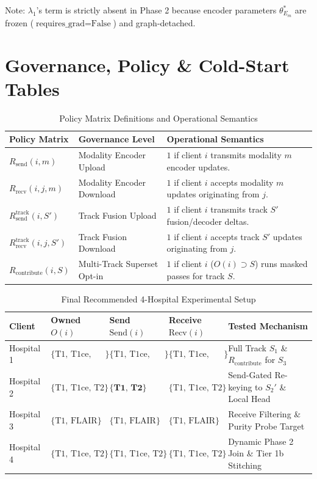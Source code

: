 \documentclass[11pt,a4paper]{article}
\begin{document}
Note: $\lambda_1$'s term is strictly absent in Phase 2 because encoder parameters $\theta_{E_m}^*$ are frozen ($\text{requires\_grad}=\text{False}$) and graph-detached.

\newpage

\section{Governance, Policy \& Cold-Start Tables}

\begin{table}[h!]
\centering
\caption{Policy Matrix Definitions and Operational Semantics}
\label{tab:policies}
\small
\begin{tabular}{@{}lll@{}}
\toprule
\textbf{Policy Matrix} & \textbf{Governance Level} & \textbf{Operational Semantics} \\ \midrule
$R_{\text{send}}(i,m)$ & Modality Encoder Upload & $1$ if client $i$ transmits modality $m$ encoder updates. \\
$R_{\text{recv}}(i,j,m)$ & Modality Encoder Download & $1$ if client $i$ accepts modality $m$ updates originating from $j$. \\
$R_{\text{send}}^{\text{track}}(i,S')$ & Track Fusion Upload & $1$ if client $i$ transmits track $S'$ fusion/decoder deltas. \\
$R_{\text{recv}}^{\text{track}}(i,j,S')$ & Track Fusion Download & $1$ if client $i$ accepts track $S'$ updates originating from $j$. \\
$R_{\text{contribute}}(i,S)$ & Multi-Track Superset Opt-in & $1$ if client $i$ ($O(i) \supset S$) runs masked passes for track $S$. \\ \bottomrule
\end{tabular}
\end{table}

\begin{table}[h!]
\centering
\caption{Final Recommended 4-Hospital Experimental Setup}
\label{tab:federation}
\small
\begin{tabular}{@{}lllll@{}}
\toprule
\textbf{Client} & \textbf{Owned $O(i)$} & \textbf{Send $\text{Send}(i)$} & \textbf{Receive $\text{Recv}(i)$} & \textbf{Tested Mechanism} \\ \midrule
Hospital 1 & $\{\text{T1, T1ce, T2, FLAIR}\}$ & $\{\text{T1, T1ce, T2, FLAIR}\}$ & $\{\text{T1, T1ce, T2, FLAIR}\}$ & Full Track $S_1$ \& $R_{\text{contribute}}$ for $S_3$ \\
Hospital 2 & $\{\text{T1, T1ce, T2}\}$ & $\mathbf{\{\text{T1, T2}\}}$ & $\{\text{T1, T1ce, T2}\}$ & Send-Gated Re-keying to $S_2'$ \& Local Head \\
Hospital 3 & $\{\text{T1, FLAIR}\}$ & $\{\text{T1, FLAIR}\}$ & $\{\text{T1, FLAIR}\}$ & Receive Filtering \& Purity Probe Target \\
Hospital 4 & $\{\text{T1, T1ce, T2}\}$ & $\{\text{T1, T1ce, T2}\}$ & $\{\text{T1, T1ce, T2}\}$ & Dynamic Phase 2 Join \& Tier 1b Stitching \\ \bottomrule
\end{tabular}
\end{table}
\end{document}
